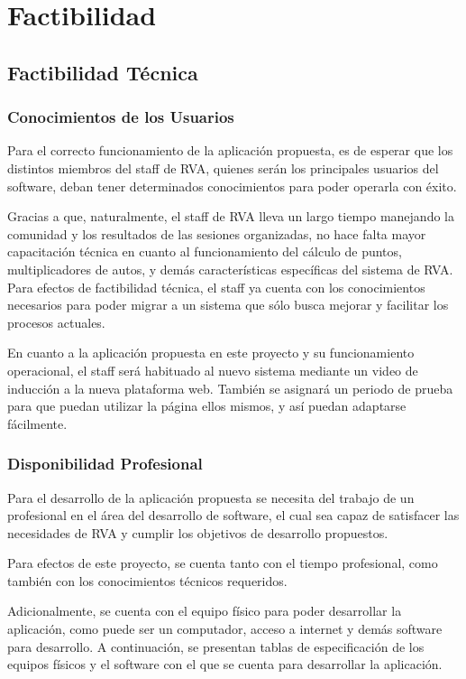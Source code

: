 \chapter{Factibilidad}

\section{Factibilidad Técnica}
\subsection{Conocimientos de los Usuarios}
Para el correcto funcionamiento de la aplicación propuesta, es de esperar que los distintos miembros del staff de RVA, quienes serán los principales usuarios del software, deban tener determinados conocimientos para poder operarla con éxito.

Gracias a que, naturalmente, el staff de RVA lleva un largo tiempo manejando la comunidad y los resultados de las sesiones organizadas, no hace falta mayor capacitación técnica en cuanto al funcionamiento del cálculo de puntos, multiplicadores de autos, y demás características específicas del sistema de RVA. Para efectos de factibilidad técnica, el staff ya cuenta con los conocimientos necesarios para poder migrar a un sistema que sólo busca mejorar y facilitar los procesos actuales.

En cuanto a la aplicación propuesta en este proyecto y su funcionamiento operacional, el staff será habituado al nuevo sistema mediante un video de inducción a la nueva plataforma web. También se asignará un periodo de prueba para que puedan utilizar la página ellos mismos, y así puedan adaptarse fácilmente.

\subsection{Disponibilidad Profesional}
Para el desarrollo de la aplicación propuesta se necesita del trabajo de un profesional en el área del desarrollo de software, el cual sea capaz de satisfacer las necesidades de RVA y cumplir los objetivos de desarrollo propuestos.

Para efectos de este proyecto, se cuenta tanto con el tiempo profesional, como también con los conocimientos técnicos requeridos.

Adicionalmente, se cuenta con el equipo físico para poder desarrollar la aplicación, como puede ser un computador, acceso a internet y demás software para desarrollo. A continuación, se presentan tablas de especificación de los equipos físicos y el software con el que se cuenta para desarrollar la aplicación.

